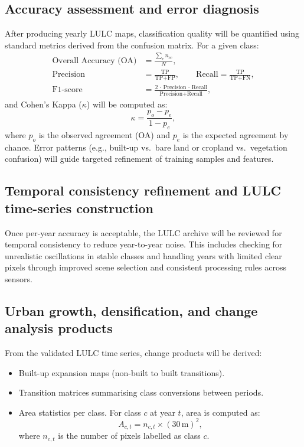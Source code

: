 \subsection{Accuracy assessment and error diagnosis}
After producing yearly LULC maps, classification quality will be quantified using standard metrics derived from the confusion matrix. For a given class:
\begin{align}
\text{Overall Accuracy (OA)} &= \frac{\sum_{c} n_{cc}}{N},\\[4pt]
\text{Precision} &= \frac{\text{TP}}{\text{TP}+\text{FP}}, \qquad
\text{Recall} = \frac{\text{TP}}{\text{TP}+\text{FN}},\\[4pt]
\text{F1-score} &= \frac{2\,\cdot\,\text{Precision}\,\cdot\,\text{Recall}}{\text{Precision}+\text{Recall}},
\end{align}
and Cohen's Kappa ($\kappa$) will be computed as:
\begin{equation}
\kappa = \frac{p_o - p_e}{1 - p_e},
\end{equation}
where $p_o$ is the observed agreement (OA) and $p_e$ is the expected agreement by chance. Error patterns (e.g., built-up vs.\ bare land or cropland vs.\ vegetation confusion) will guide targeted refinement of training samples and features.

\subsection{Temporal consistency refinement and LULC time-series construction}
Once per-year accuracy is acceptable, the LULC archive will be reviewed for temporal consistency to reduce year-to-year noise. This includes checking for unrealistic oscillations in stable classes and handling years with limited clear pixels through improved scene selection and consistent processing rules across sensors.

\subsection{Urban growth, densification, and change analysis products}
From the validated LULC time series, change products will be derived:
\begin{itemize}
  \item Built-up expansion maps (non-built to built transitions).
  \item Transition matrices summarising class conversions between periods.
  \item Area statistics per class. For class $c$ at year $t$, area is computed as:
  \begin{equation}
  A_{c,t} = n_{c,t} \times (30\,\text{m})^{2},
  \end{equation}
  where $n_{c,t}$ is the number of pixels labelled as class $c$.
\end{itemize}

